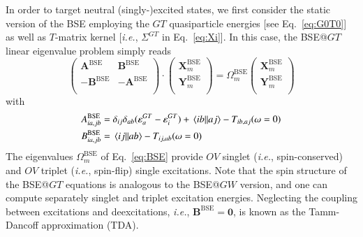 \documentclass[aip,jcp,reprint,noshowkeys,superscriptaddress]{revtex4-1}
\newcommand{\ie}{\textit{i.e.}}
\newcommand{\BSE}{\text{BSE}}
\newcommand{\GT}{GT}
\newcommand{\e}[2]{\eps_{#1}^{#2}}
\newcommand{\Om}[2]{\Omega_{#1}^{#2}}
\newcommand{\bO}{\mathbf{0}}
\newcommand{\bA}[2]{\mathbf{A}_{#1}^{#2}}
\newcommand{\bB}[2]{\mathbf{B}_{#1}^{#2}}
\newcommand{\bX}[2]{\mathbf{X}_{#1}^{#2}}
\newcommand{\bY}[2]{\mathbf{Y}_{#1}^{#2}}
\newcommand{\eps}{\varepsilon}
\begin{document}
In order to target neutral (singly-)excited states, we first consider the static version of the BSE employing the $GT$ quasiparticle energies [see Eq.~\eqref{eq:G0T0}] as well as $T$-matrix kernel [\ie, $\Sigma^{\GT}$ in Eq.~\eqref{eq:Xi}].
In this case, the BSE@$GT$ linear eigenvalue problem simply reads
\begin{equation}
\label{eq:BSE}
	\begin{pmatrix}
		\bA{}{\BSE}		&	\bB{}{\BSE}	\\
		-\bB{}{\BSE}	&	-\bA{}{\BSE}	\\
	\end{pmatrix}
	\cdot
	\begin{pmatrix}
		\bX{m}{\BSE}	\\
		\bY{m}{\BSE}	\\
	\end{pmatrix}
	=
	\Om{m}{\BSE}
	\begin{pmatrix}
		\bX{m}{\BSE}	\\
		\bY{m}{\BSE}	\\
	\end{pmatrix}
\end{equation}
with 
\begin{subequations}
\begin{align}
	A_{ia,jb}^{\BSE} & = \delta_{ij} \delta_{ab} (\e{a}{\GT} - \e{i}{\GT}) + \mel{ib}{}{aj} - T_{ib,aj}(\omega=0)
	\\ 
	B_{ia,jb}^{\BSE} & = \mel{ij}{}{ab} - T_{ij,ab}(\omega=0)
\end{align}
\end{subequations}
The eigenvalues $\Om{m}{\BSE}$ of Eq.~\eqref{eq:BSE} provide $OV$ singlet (\ie, spin-conserved) and $OV$ triplet  (\ie, spin-flip) single excitations.
Note that the spin structure of the BSE@$GT$ equations is analogous to the BSE@$GW$ version, \cite{Monino_2021} and one can compute separately singlet and triplet excitation energies.
Neglecting the coupling between excitations and deexcitations, \ie, $\bB{}{\BSE} = \bO$, is known as the Tamm-Dancoff approximation (TDA).
\end{document}
